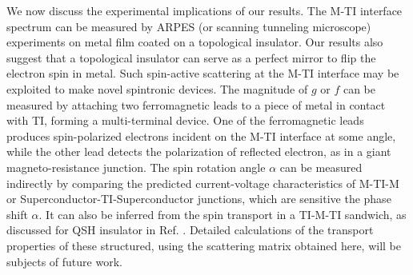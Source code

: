 We now discuss the experimental implications of our results. The M-TI interface spectrum can be measured by 
ARPES (or scanning tunneling microscope) experiments on metal film coated on a topological insulator.
Our results also suggest that a topological insulator can serve as a perfect mirror to flip the 
electron spin in metal. Such spin-active scattering at the M-TI interface may be 
exploited to make novel spintronic devices. The magnitude of $g$ or $f$
can be measured by attaching two ferromagnetic leads to a piece of metal in contact with TI, 
forming a multi-terminal device. 
One of the ferromagnetic leads produces spin-polarized electrons incident on the M-TI interface at some angle, while 
the other lead detects the polarization of reflected electron, as in a
giant magneto-resistance junction. The spin rotation angle $\alpha$ can be measured 
indirectly by comparing the predicted current-voltage characteristics of M-TI-M 
or Superconductor-TI-Superconductor junctions, which are sensitive the phase shift $\alpha$. It can also be inferred from 
the spin transport in a TI-M-TI sandwich, as discussed for QSH insulator in Ref. \cite{yokoyama09}.
Detailed calculations of the transport properties of these structured,
using the scattering matrix obtained here, will be subjects of future work.
